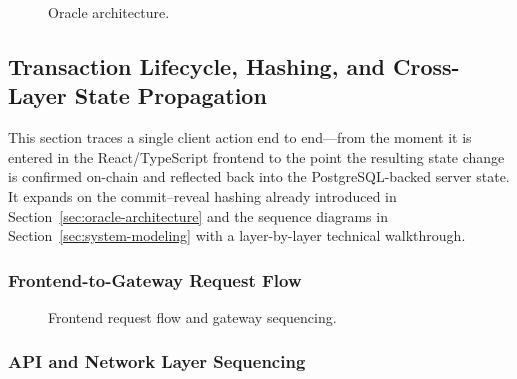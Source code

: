 \begin{figure}[H]
\centering
{}
\caption[Oracle architecture]{Oracle architecture.}
\label{fig:oracle-architecture}
\end{figure}


\subsection{Transaction Lifecycle, Hashing, and Cross-Layer State Propagation}
\label{sec:tx-lifecycle-hashing}

This section traces a single client action end to end---from the moment it is entered in the React/TypeScript frontend to the point the resulting state change is confirmed on-chain and reflected back into the PostgreSQL-backed server state. It expands on the commit--reveal hashing already introduced in Section~\ref{sec:oracle-architecture} and the sequence diagrams in Section~\ref{sec:system-modeling} with a layer-by-layer technical walkthrough.

\subsubsection{Frontend-to-Gateway Request Flow}
\label{sec:frontend-gateway-flow}

\begin{figure}[H]
\centering
{}
\caption[Frontend request flow and gateway sequencing]{Frontend request flow and gateway sequencing.}
\label{fig:frontend-gateway-flow}
\end{figure}


\subsubsection{API and Network Layer Sequencing}
\label{sec:api-network-sequencing}


